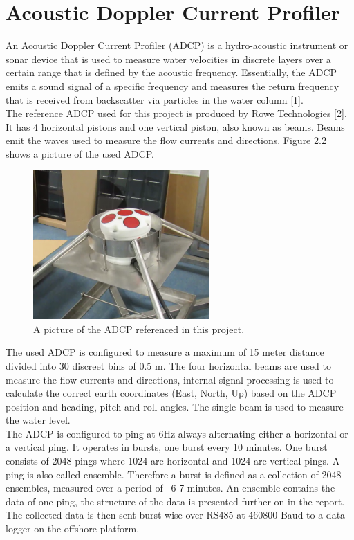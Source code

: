 \section{Acoustic Doppler Current Profiler}
An Acoustic Doppler Current Profiler (ADCP) is a hydro-acoustic instrument or sonar device that is used to measure water velocities in discrete layers over a certain range that is defined by the acoustic frequency. Essentially, the ADCP emits a sound signal of a specific frequency and measures the return frequency that is received from backscatter via particles in the water column [1].\\
The reference ADCP used for this project is produced by Rowe Technologies [2]. It has 4 horizontal pistons and one vertical piston, also known as beams. Beams emit the waves used to measure the flow currents and directions. Figure 2.2 shows a picture of the used ADCP.\\
\begin{figure}[h]
\centering
      \includegraphics[width=0.6\textwidth]{adcp}
        \caption{A picture of the ADCP referenced in this project. }
\end{figure}
The used ADCP is configured to measure a maximum of 15 meter distance divided into 30 discreet bins of 0.5 m. The four horizontal beams are used to measure the flow currents and directions, internal signal processing is used to calculate the correct earth coordinates (East, North, Up) based on the ADCP position and heading, pitch and roll angles. The single beam is used to measure the water level.\\
The ADCP is configured to ping at 6Hz always alternating either a horizontal or a vertical ping. It operates in bursts, one burst every 10 minutes. One burst consists of 2048 pings where 1024 are horizontal and 1024 are vertical pings. A ping is also called ensemble. Therefore a burst is defined as a collection of 2048 ensembles, measured over a period of ~6-7 minutes. An ensemble contains the data of one ping, the structure of the data is presented further-on in the report. The collected data is then sent burst-wise over RS485 at 460800 Baud to a data-logger on the offshore platform.

